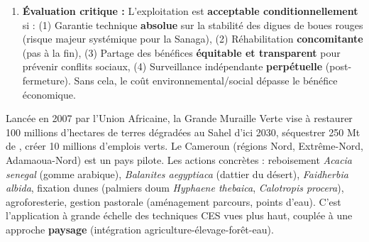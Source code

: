 \documentclass[11pt]{article}
\newcommand{\cle}[1]{{\popxbold\color{popdark}#1}}
\begin{document}
\begin{exoresolu}
\begin{enumerate}
\begin{itemize}
            \item \textbf{Sols/Paysage :} Remise en état progressive (réhabilitation) : remise en place sol végétal, reboisement essences locales (acacias, eucalyptus, essences fourragères), création zones humides compensatoires.
            \item \textbf{Biodiversité :} Couloirs de migration maintenus. Plan anti-braconnage (écogardes financés par mine). Sauvegarde espèces menacées (ex. \emph{Hippotragus equinus koba} - cob de Buffon).
            \item \textbf{Social :} Plan de réinstallation (RAP - Resettlement Action Plan) conforme standards Banque Mondiale (IFC PS5) : compensation juste, terres de remplacement, maintien moyens d'existence. Plan de développement communautaire (PDC) financé par fonds minier local (1-2\% CA). Clause de main-d'œuvre locale.
            \item \textbf{Gouvernance :} Comité de suivi tripartite (État, Entreprise, Société Civile/Communautés). Publication contrats (ITIE - Initiative pour la Transparence dans les Industries Extractives). Audit environnemental annuel indépendant.
        \end{itemize}
    \item \textbf{Évaluation critique :} L'exploitation est \textbf{acceptable conditionnellement} si : (1) Garantie technique \textbf{absolue} sur la stabilité des digues de boues rouges (risque majeur systémique pour la Sanaga), (2) Réhabilitation \textbf{concomitante} (pas à la fin), (3) Partage des bénéfices \textbf{équitable et transparent} pour prévenir conflits sociaux, (4) Surveillance indépendante \textbf{perpétuelle} (post-fermeture). Sans cela, le coût environnemental/social dépasse le bénéfice économique.
\end{enumerate}
\end{exoresolu}

\begin{savaistu}
Lancée en 2007 par l'Union Africaine, la \cle{Grande Muraille Verte} vise à restaurer 100 millions d'hectares de terres dégradées au Sahel d'ici 2030, séquestrer 250 Mt de , créer 10 millions d'emplois verts. Le Cameroun (régions Nord, Extrême-Nord, Adamaoua-Nord) est un pays pilote. Les actions concrètes : reboisement \emph{Acacia senegal} (gomme arabique), \emph{Balanites aegyptiaca} (dattier du désert), \emph{Faidherbia albida}, fixation dunes (palmiers doum \emph{Hyphaene thebaica}, \emph{Calotropis procera}), agroforesterie, gestion pastorale (aménagement parcours, points d'eau). C'est l'application à grande échelle des techniques CES vues plus haut, couplée à une approche \textbf{paysage} (intégration agriculture-élevage-forêt-eau).
\end{savaistu}
\end{document}
